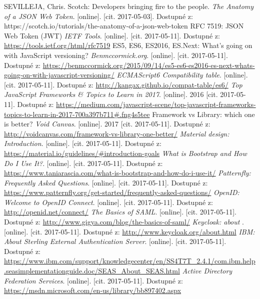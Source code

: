 \begin{thebibliography}{99}
SEVILLEJA, Chris.
Scotch: Developers bringing fire to the people. \textit{The Anatomy of a JSON Web Token}.
[online]. [cit. 2017-05-03]. Dostupné z: https://scotch.io/tutorials/the-anatomy-of-a-json-web-token
RFC 7519: JSON Web Token (JWT)
\textit{IETF Tools}.
[online]. [cit. 2017-05-11]. Dostupné z: \url{https://tools.ietf.org/html/rfc7519}
ES5, ES6, ES2016, ES.Next: What's going on with JavaScript versioning?
\textit{Benmccormick.org}.
[online]. [cit. 2017-05-11]. Dostupné z: \url{https://benmccormick.org/2015/09/14/es5-es6-es2016-es-next-whats-going-on-with-javascript-versioning/}
\textit{ECMAScript6 Compatibility table}.
[online]. [cit. 2017-05-11]. Dostupné z: \url{http://kangax.github.io/compat-table/es6/}
\textit{Top JavaScript Frameworks \& Topics to Learn in 2017}.
[online]. 2016 [cit. 2017-05-11].  Dostupné z:  \url{https://medium.com/javascript-scene/top-javascript-frameworks-topics-to-learn-in-2017-700a397b711#.fng4s5tee}
Framework vs Library: which one is better?
\textit{Void Canvas}.
[online]. 2017 [cit. 2017-05-11]. Dostupné z: \url{http://voidcanvas.com/framework-vs-library-one-better/}
\textit{Material design: Introduction}.
[online]. [cit. 2017-05-11]. Dostupné z: \url{https://material.io/guidelines/#introduction-goals}
\textit{What is Bootstrap and How Do I Use It?}.
[online]. [cit. 2017-05-11]. Dostupné z: \url{https://www.taniarascia.com/what-is-bootstrap-and-how-do-i-use-it/}
\textit{Patternfly: Frequently Asked Questions}.
[online]. [cit. 2017-05-11]. Dostupné z: \url{https://www.patternfly.org/get-started/frequently-asked-questions/}
\textit{OpenID: Welcome to OpenID Connect}.
[online]. [cit. 2017-05-11]. Dostupné z: \url{http://openid.net/connect/}
\textit{The Basics of SAML}.
[online]. [cit. 2017-05-11]. Dostupné z: \url{http://www.gigya.com/blog/the-basics-of-saml/}
\textit{Keycloak: about }.
[online]. [cit. 2017-05-11]. Dostupné z: \url{http://www.keycloak.org/about.html}
\textit{IBM: About Sterling External Authentication Server}.
[online]. [cit. 2017-05-11]. Dostupné z: \url{https://www.ibm.com/support/knowledgecenter/en/SS4T7T_2.4.1/com.ibm.help.seasimplementationguide.doc/SEAS_About_SEAS.html}
\textit{Active Directory Federation Services}.
[online]. [cit. 2017-05-11]. Dostupné z: \url{https://msdn.microsoft.com/en-us/library/bb897402.aspx}

\end{thebibliography}
